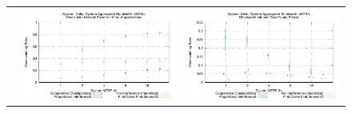 \documentclass[conference]{IEEEtran}
\begin{document}
\begin{figure}[t]
\begin{tabular}{C{.02\linewidth}C{.49\linewidth}C{.49\linewidth}}
 & \includegraphics[width=\linewidth]{sim/figures/40gbs-1hckpt-ckpt-celio.pdf} & \includegraphics[width=\linewidth]{sim/figures/40gbs-dalyckpt-ckpt-celio.pdf} \\

\end{tabular}
\end{figure}
\end{document}
